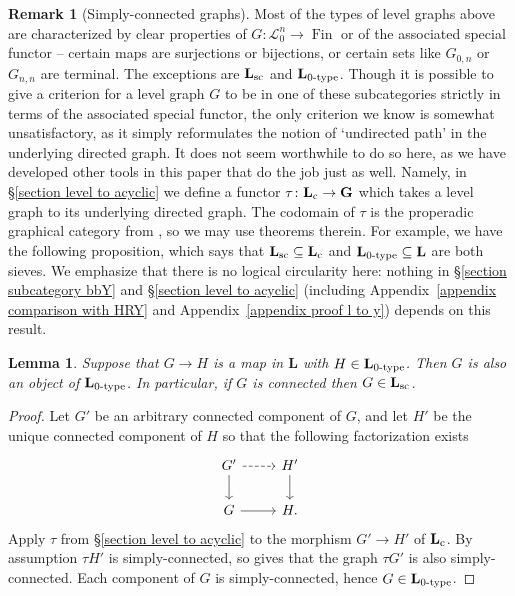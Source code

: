 \documentclass{amsart}
\numberwithin{theorem}{subsection}
\newtheorem{lemma}[theorem]{Lemma}
\theoremstyle{definition}
\newtheorem{remark}[theorem]{Remark}
\newcommand{\finset}{\operatorname{Fin}}
\newcommand{\name}[1]{\ensuremath{\text{\textup{#1}}}}
\newcommand{\levelg}{\mathbf{L}}
\newcommand{\levelgconn}{\levelg_{\name{c}}}
\newcommand{\bbY}{\mathbf{G}}
\newcommand{\scriptyell}{\mathscr L}
\begin{document}
\begin{remark}[Simply-connected graphs]
Most of the types of level graphs above are characterized by clear properties of $G \colon \scriptyell^n_0 \to \finset$ or of the associated special functor -- certain maps are surjections or bijections, or certain sets like $G_{0,n}$ or $G_{n,n}$ are terminal.
The exceptions are $\levelg_{\name{sc}}$ and $\levelg_{\name{0-type}}$.
Though it is possible to give a criterion for a level graph $G$ to be in one of these subcategories strictly in terms of the associated special functor, the only criterion we know is somewhat unsatisfactory, as it simply reformulates the notion of `undirected path' in the underlying directed graph.
It does not seem worthwhile to do so here, as we have developed other tools in this paper that do the job just as well.
Namely, in \S\ref{section level to acyclic} we define a functor $\tau \colon \levelgconn \to \bbY$ which takes a level graph to its underlying directed graph.
The codomain of $\tau$ is the properadic graphical category from \cite{hrybook}, so we may use theorems therein.
For example, we have the following proposition, which says that $\levelg_{\name{sc}} \subseteq \levelgconn$ and $\levelg_{\name{0-type}} \subseteq \levelg$ are both sieves. 
We emphasize that there is no logical circularity here: nothing in \S\ref{section subcategory bbY} and \S\ref{section level to acyclic} (including Appendix~\ref{appendix comparison with HRY} and Appendix~\ref{appendix proof l to y}) depends on this result.
\end{remark}

\begin{lemma}\label{lemma simply connected sieves}
Suppose that $G \to H$ is a map in $\levelg$ with $H\in \levelg_{\name{0-type}}$. Then $G$ is also an object of $\levelg_{\name{0-type}}$.
In particular, if $G$ is connected then $G\in \levelg_{\name{sc}}$.
\end{lemma}
\begin{proof}
Let $G'$ be an arbitrary connected component of $G$, and let $H'$ be the unique connected component of $H$ so that the following factorization exists
\[ \begin{tikzcd}
G' \rar[dashed] \dar & H'\dar  \\
G \rar & H.
\end{tikzcd} \]
Apply $\tau$ from \S\ref{section level to acyclic} to the morphism $G' \to H'$ of $\levelgconn$.
By assumption $\tau H'$ is simply-connected, so \cite[Proposition 5.2.8]{hrybook} gives that the graph $\tau G'$ is also simply-connected.
Each component of $G$ is simply-connected, hence $G\in \levelg_{\name{0-type}}$.
\end{proof}
\end{document}
